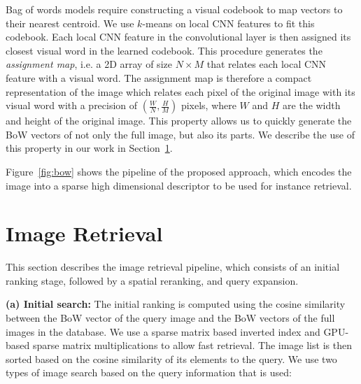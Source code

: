 \documentclass{sig-arxiv}
\begin{document}
Bag of words models require constructing a visual codebook to map vectors to their nearest centroid. We use $k$-means on local CNN features to fit this codebook. Each local CNN feature in the convolutional layer is then assigned its closest visual word in the learned codebook. This procedure generates the \textit{assignment map}, i.e. a 2D array of size $N \times M$ that relates each local CNN feature with a visual word. The assignment map is therefore a compact representation of the image which relates each pixel of the original image with its visual word with a precision of $ \left(\frac{W}{N}, \frac{H}{M}\right)$ pixels, where $W$ and $H$ are the width and height of the original image. This property allows us to quickly generate the BoW vectors of not only the full image, but also its parts. We describe the use of this property in our work in Section~\ref{5_retrieval}.

Figure~\ref{fig:bow} shows the pipeline of the proposed approach, which encodes the image into a sparse high dimensional descriptor to be used for instance retrieval.


\section{Image Retrieval}\label{5_retrieval}

This section describes the image retrieval pipeline, which consists of an initial ranking stage, followed by a spatial reranking, and query expansion.

\textbf{(a) Initial search: }  The initial ranking is computed using the cosine similarity between the BoW vector of the query image and the BoW vectors of the full images in the database. We use a sparse matrix based inverted index and GPU-based sparse matrix multiplications to allow fast retrieval. The image list is then sorted based on the cosine similarity of its elements to the query. We use two types of image search based on the query information that is used:

\end{document}
